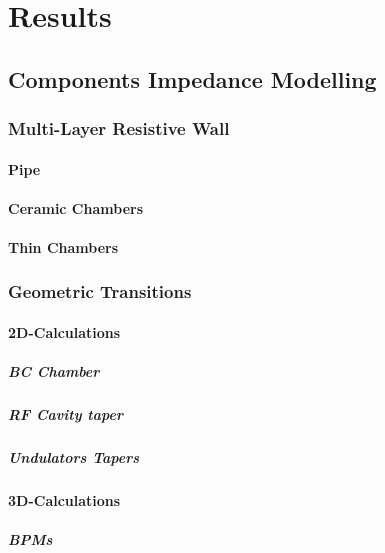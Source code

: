 \documentclass[
	12pt,				%
	openright,			%
	oneside,			%
	a4paper,		%
	chapter=TITLE,		%
	section=TITLE,		%
    brazil,				%
	english,			%
	sumario=tradicional,
	]{abntex2}
\begin{document}
  \section{}

\chapter{Results}
  \section{Components Impedance Modelling}
    \subsection{Multi-Layer Resistive Wall}
      \subsubsection{Pipe}
      \subsubsection{Ceramic Chambers}
      \subsubsection{Thin Chambers}
    \subsection{Geometric Transitions}
      \subsubsection{2D-Calculations}
        \paragraph{BC Chamber}
        \paragraph{RF Cavity taper}
        \paragraph{Undulators Tapers}
      \subsubsection{3D-Calculations}
        \paragraph{BPMs}
\end{document}
